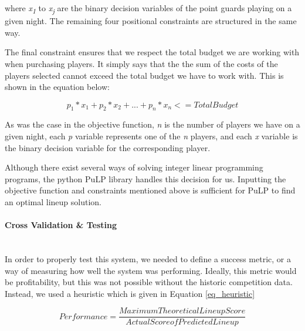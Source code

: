 where \textit{x\textsubscript{1}} to \textit{x\textsubscript{j}} are the binary decision variables of the point guards playing on a given night. The remaining four positional constraints are structured in the same way.

The final constraint ensures that we respect the total budget we are working with when purchasing players. It simply says that the the sum of the costs of the players selected cannot exceed the total budget we have to work with. This is shown in the equation below:

\[ p_1*x_1 + p_2*x_2 + ... + p_n*x_n <= Total Budget \]

As was the case in the objective function, \textit{n} is the number of players we have on a given night, each \textit{p} variable represents one of the \textit{n} players, and each \textit{x} variable is the binary decision variable for the corresponding player.

Although there exist several ways of solving integer linear programming programs, the python PuLP library handles this decision for us. Inputting the objective function and constraints mentioned above is sufficient for PuLP to find an optimal lineup solution.

\paragraph{Cross Validation \& Testing}\mbox{}\\
In order to properly test this system, we needed to define a success metric, or a way of measuring how well the system was performing. Ideally, this metric would be profitability, but this was not possible without the historic competition data. Instead, we used a heuristic which is given in Equation \ref{eq_heuristic}

\begin{equation}
Performance = \frac{Maximum Theoretical Lineup Score}{Actual Score of Predicted Lineup}
\label{eq_heuristic}
\end{equation}

